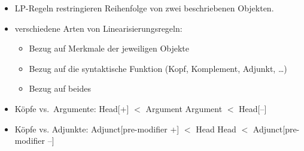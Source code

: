 {{\begin{itemize}
\item LP-Regeln restringieren Reihenfolge von zwei beschriebenen Objekten.
\pause
\item verschiedene Arten von Linearisierungsregeln: 
      \begin{itemize}
      \item Bezug auf Merkmale der jeweiligen Objekte
\pause
      \item Bezug auf die syntaktische Funktion (Kopf, Komplement, Adjunkt, \ldots)
\pause
      \item Bezug auf beides
      \end{itemize}
\pause
\item Köpfe vs.\ Argumente:
\eal
\ex Head[\initial+] $<$ Argument
\ex Argument $<$ Head[\initial--]
\zl
\pause
\item Köpfe vs. Adjunkte:
\eal
\ex Adjunct[{\sc pre-modifier} +] $<$ Head
\ex Head $<$ Adjunct[{\sc pre-modifier} --]
\zl
\end{itemize}
}

}
